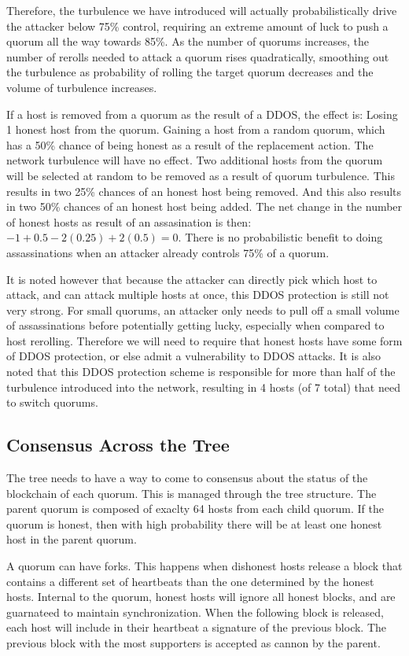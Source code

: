 \documentclass[twocolumn]{article}
\begin{document}
Therefore, the turbulence we have introduced will actually probabilistically drive the attacker below 75\% control, requiring an extreme amount of luck to push a quorum all the way towards 85\%.
As the number of quorums increases, the number of rerolls needed to attack a quorum rises quadratically, smoothing out the turbulence as probability of rolling the target quorum decreases and the volume of turbulence increases.

If a host is removed from a quorum as the result of a DDOS, the effect is:
Losing 1 honest host from the quorum.
Gaining a host from a random quorum, which has a 50\% chance of being honest as a result of the replacement action.
The network turbulence will have no effect.
Two additional hosts from the quorum will be selected at random to be removed as a result of quorum turbulence.
This results in two 25\% chances of an honest host being removed.
And this also results in two 50\% chances of an honest host being added.
The net change in the number of honest hosts as result of an assasination is then: $-1 + 0.5 - 2(0.25) + 2(0.5) = 0$.
There is no probabilistic benefit to doing assassinations when an attacker already controls 75\% of a quorum.

It is noted however that because the attacker can directly pick which host to attack, and can attack multiple hosts at once, this DDOS protection is still not very strong.
For small quorums, an attacker only needs to pull off a small volume of assassinations before potentially getting lucky, especially when compared to host rerolling.
Therefore we will need to require that honest hosts have some form of DDOS protection, or else admit a vulnerability to DDOS attacks.
It is also noted that this DDOS protection scheme is responsible for more than half of the turbulence introduced into the network, resulting in 4 hosts (of 7 total) that need to switch quorums.

\subsection{Consensus Across the Tree}
The tree needs to have a way to come to consensus about the status of the blockchain of each quorum.
This is managed through the tree structure.
The parent quorum is composed of exaclty 64 hosts from each child quorum.
If the quorum is honest, then with high probability there will be at least one honest host in the parent quorum.

A quorum can have forks.
This happens when dishonest hosts release a block that contains a different set of heartbeats than the one determined by the honest hosts.
Internal to the quorum, honest hosts will ignore all honest blocks, and are guarnateed to maintain synchronization.
When the following block is released, each host will include in their heartbeat a signature of the previous block.
The previous block with the most supporters is accepted as cannon by the parent.
\end{document}
